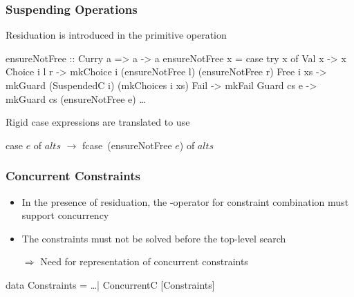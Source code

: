\documentclass[
,hyperref={pdfpagelabels=false}
,xcolor=dvipsnames
]{beamer}
\newcommand{\ergo}{$\Rightarrow$}
\begin{document}
\begin{frame}[fragile]%
\frametitle{Suspending Operations}

Residuation is introduced in the primitive operation 

\begin{haskell}
ensureNotFree :: Curry a => a -> a
ensureNotFree x = case try x of
  Val x        -> x
  Choice i l r -> mkChoice i (ensureNotFree l) (ensureNotFree r)
  \alert{Free i xs    -> mkGuard (SuspendedC i) (mkChoices i xs)}
  Fail         -> mkFail
  Guard cs e   -> mkGuard cs (ensureNotFree e)
  \ldots
\end{haskell}

\pause

Rigid case expressions are translated to use 

\begin{example}
case $e$ of $alts$ $\to$ fcase\footnotemark~(ensureNotFree $e$) of $alts$
\end{example}
\end{frame}

\begin{frame}[fragile]%
\frametitle{Concurrent Constraints}

\begin{itemize}
\item In the presence of residuation, the \code{(\&)}-operator
      for constraint combination must support concurrency
\item The constraints must not be solved before the top-level search
\item[\ergo] Need for representation of concurrent constraints
\end{itemize}


\begin{haskell}
data Constraints = \ldots \alert{| ConcurrentC [Constraints]}
\end{haskell}
\end{frame}
\end{document}
